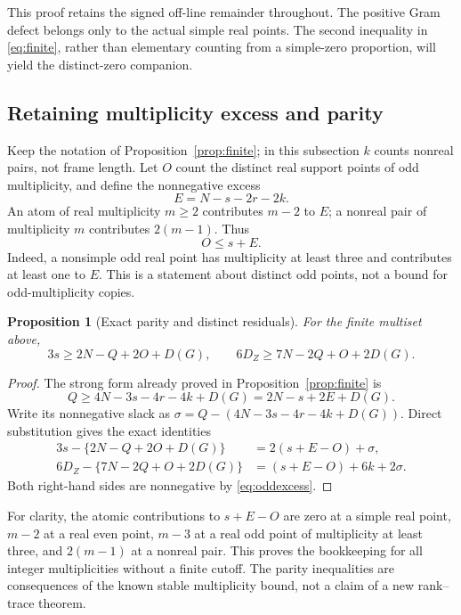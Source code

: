 \documentclass[11pt]{article}
\newtheorem{proposition}[theorem]{Proposition}
\theoremstyle{remark}
\begin{document}
This proof retains the signed off-line remainder throughout. The positive
Gram defect belongs only to the actual simple real points. The second
inequality in \eqref{eq:finite}, rather than elementary counting from a
simple-zero proportion, will yield the distinct-zero companion.

\subsection{Retaining multiplicity excess and parity}

Keep the notation of Proposition~\ref{prop:finite}; in this subsection $k$
counts nonreal pairs, not frame length. Let $O$ count the distinct real
support points of odd multiplicity, and define the nonnegative excess
\begin{equation}\label{eq:excess}
 E=N-s-2r-2k.
\end{equation}
An atom of real multiplicity $m\ge2$ contributes $m-2$ to $E$; a nonreal
pair of multiplicity $m$ contributes $2(m-1)$. Thus
\begin{equation}\label{eq:oddexcess}
 O\le s+E.
\end{equation}
Indeed, a nonsimple odd real point has multiplicity at least three and
contributes at least one to $E$. This is a statement about distinct odd
points, not a bound for odd-multiplicity copies.

\begin{proposition}[Exact parity and distinct residuals]\label{prop:parity}
For the finite multiset above,
\begin{equation}\label{eq:finiteparity}
 3s\ge2N-Q+2O+D(G),\qquad
 6D_Z\ge7N-2Q+O+2D(G).
\end{equation}
\end{proposition}
\begin{proof}
The strong form already proved in Proposition~\ref{prop:finite} is
\[
 Q\ge4N-3s-4r-4k+D(G)=2N-s+2E+D(G).
\]
Write its nonnegative slack as
$\sigma=Q-(4N-3s-4r-4k+D(G))$. Direct substitution gives the exact
identities
\begin{align}
3s-\{2N-Q+2O+D(G)\}&=2(s+E-O)+\sigma,
\label{eq:parityresidual}\\
6D_Z-\{7N-2Q+O+2D(G)\}&=(s+E-O)+6k+2\sigma.
\label{eq:distinctresidual}
\end{align}
Both right-hand sides are nonnegative by \eqref{eq:oddexcess}.
\end{proof}

For clarity, the atomic contributions to $s+E-O$ are zero at a simple
real point, $m-2$ at a real even point, $m-3$ at a real odd point of
multiplicity at least three, and $2(m-1)$ at a nonreal pair. This proves
the bookkeeping for all integer multiplicities without a finite cutoff.
The parity inequalities are consequences of the known stable multiplicity
bound, not a claim of a new rank--trace theorem.
\end{document}
